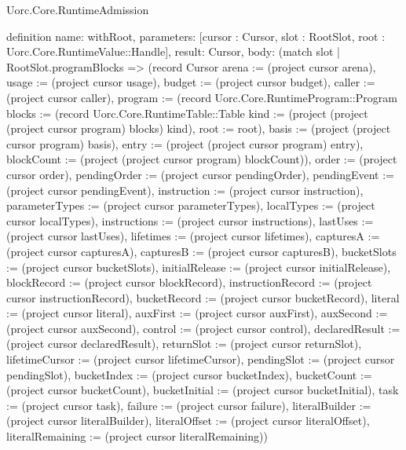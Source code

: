 \begin{lexlean}{Uorc.Core.RuntimeAdmission}
\begin{semanticmodule}
definition{
  name: withRoot,
  parameters: [cursor : Cursor, slot : RootSlot, root : Uorc.Core.RuntimeValue::Handle],
  result: Cursor,
  body: (match slot
    | RootSlot.programBlocks => (record Cursor {arena := (project cursor arena), usage := (project cursor usage), budget := (project cursor budget), caller := (project cursor caller), program := (record Uorc.Core.RuntimeProgram::Program {blocks := (record Uorc.Core.RuntimeTable::Table {kind := (project (project (project cursor program) blocks) kind), root := root}), basis := (project (project cursor program) basis), entry := (project (project cursor program) entry), blockCount := (project (project cursor program) blockCount)}), order := (project cursor order), pendingOrder := (project cursor pendingOrder), pendingEvent := (project cursor pendingEvent), instruction := (project cursor instruction), parameterTypes := (project cursor parameterTypes), localTypes := (project cursor localTypes), instructions := (project cursor instructions), lastUses := (project cursor lastUses), lifetimes := (project cursor lifetimes), capturesA := (project cursor capturesA), capturesB := (project cursor capturesB), bucketSlots := (project cursor bucketSlots), initialRelease := (project cursor initialRelease), blockRecord := (project cursor blockRecord), instructionRecord := (project cursor instructionRecord), bucketRecord := (project cursor bucketRecord), literal := (project cursor literal), auxFirst := (project cursor auxFirst), auxSecond := (project cursor auxSecond), control := (project cursor control), declaredResult := (project cursor declaredResult), returnSlot := (project cursor returnSlot), lifetimeCursor := (project cursor lifetimeCursor), pendingSlot := (project cursor pendingSlot), bucketIndex := (project cursor bucketIndex), bucketCount := (project cursor bucketCount), bucketInitial := (project cursor bucketInitial), task := (project cursor task), failure := (project cursor failure), literalBuilder := (project cursor literalBuilder), literalOffset := (project cursor literalOffset), literalRemaining := (project cursor literalRemaining)})
}
\end{semanticmodule}
\end{lexlean}
